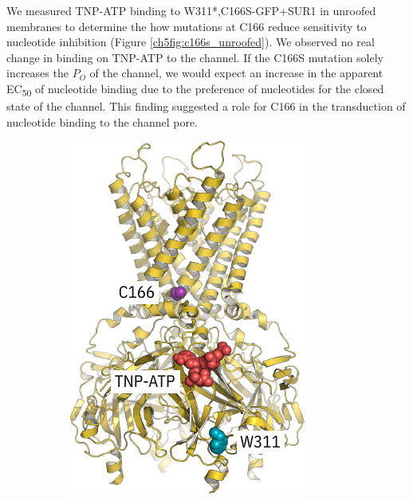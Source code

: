 We measured TNP-ATP binding to W311*,C166S-GFP+SUR1 in unroofed membranes to determine the how mutations at C166 reduce sensitivity to nucleotide inhibition (Figure \ref{ch5fig:c166s_unroofed}).
We observed no real change in binding on TNP-ATP to the channel.
If the C166S mutation solely increases the $P_O$ of the channel, we would expect an increase in the apparent EC\textsubscript{50} of nucleotide binding due to the preference of nucleotides for the closed state of the channel.
This finding suggested a role for C166 in the transduction of nucleotide binding
to the channel pore.

\begin{figure}[h]
	\centering
	\begin{subfigure}[t]{0.3\textwidth}
		\caption{}\label{ch5fig:c166s_loc}
		\centering
		\includegraphics[width=\textwidth]{c166s_1.pdf}

\end{subfigure}
\end{figure}
